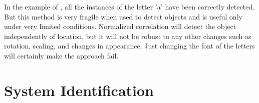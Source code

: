 





In the example of \fig{\ref{fig:normcorr}}, all the instances of the letter 'a' have been correctly detected. But this method is very fragile when used to detect objects and is useful only under very limited conditions. Normalized correlation will detect the object independently of location, but it will not be robust to any other changes such as rotation, scaling, and changes in appearance. Just changing the font of the letters will certainly make the approach fail.  

\section{System Identification}

